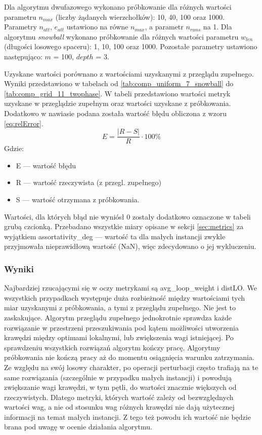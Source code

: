 Dla algorytmu dwufazowego wykonano próbkowanie dla różnych wartości parametru $n_{max}$ (liczby żądanych wierzchołków): 10, 40, 100 oraz 1000.
Parametry $n_{att}$, $e_{att}$ ustawiono na równe $n_{max}$, a parametr $n_{runs}$ na 1.
Dla algorytmu \textit{snowball} wykonano próbkowanie dla różnych wartości parametru $w_{len}$ (długości losowego spaceru): 1, 10, 100 oraz 1000.
Pozostałe parametry ustawiono następująco: $m$ = 100, $depth$ = 3.

Uzyskane wartości porównano z wartościami uzyskanymi z przeglądu zupełnego.
Wyniki przedstawiono w tabelach od \ref{tab:comp_uniform_7_snowball} do \ref{tab:comp_grid_11_twophase}.
W tabeli przedstawiono wartości metryk uzyskane w przeglądzie zupełnym oraz wartości uzyskane z próbkowania.
Dodatkowo w nawiasie podana została wartość błędu obliczona z wzoru \ref{eq:relError}.
\begin{equation}
    \label{eq:relError}
    E = \frac{|R - S|}{R} \cdot 100\%
\end{equation}
Gdzie:
\begin{itemize}
    \item E --- wartość błędu
    \item R --- wartość rzeczywista (z przegl. zupełnego)
    \item S --- wartość otrzymana z próbkowania.
\end{itemize}

Wartości, dla których błąd nie wyniósł 0 zostały dodatkowo oznaczone w tabeli grubą czcionką.
Przebadano wszystkie miary opisane w sekcji \ref{sec:metrics} za wyjątkiem assortativity\_deg --- wartość ta dla małych instancji zwykle przyjmowała
nieprawidłową wartość (NaN), więc zdecydowano o jej wykluczeniu.

\subsubsection{Wyniki}



Najbardziej rzucającymi się w oczy metrykami są avg\_loop\_weight i distLO.
We wszystkich przypadkach występuje duża rozbieżność między wartościami tych miar uzyskanymi z próbkowania, a tymi z przeglądu zupełnego.
Nie jest to zaskakujące. Algorytm przeglądu zupełnego jednokrotnie sprawdza każde rozwiązanie w przestrzeni przeszukiwania pod kątem
możliwości utworzenia krawędzi między optimami lokalnymi, lub zwiększenia wagi istniejącej.
Po sprawdzeniu wszystkich rozwiązań algorytm kończy pracę.
Algorytmy próbkowania nie kończą pracy aż do momentu osiągnięcia warunku zatrzymania.
Ze względu na swój losowy charakter, po operacji perturbacji często trafiają na te same rozwiązania
(szczególnie w przypadku małych instancji) i powodują zwiększanie wagi krawędzi, w tym pętli, do wartości znacznie większych od rzeczywistych.
Dlatego metryki, których wartość zależy od bezwzględnych wartości wag, a nie od stosunku wag różnych krawędzi nie dają użytecznej informacji na temat małych instancji.
Z tego też powodu ich wartość nie będzie brana pod uwagę w ocenie działania algorytmu.

